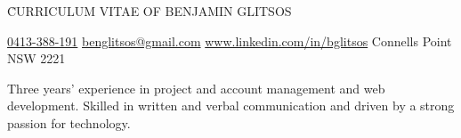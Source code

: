 \documentclass{resume}
\begin{document}
\h{CURRICULUM VITAE OF BENJAMIN GLITSOS}

\begin{center}
    \href{tel:0413-388-191}{0413-388-191} \textbar{} \href{mailto:benglitsos@gmail.com}{benglitsos@gmail.com} \textbar{} \href{www.linkedin.com/in/bglitsos}{www.linkedin.com/in/bglitsos} \textbar{} Connells Point NSW 2221
\end{center}


\begin{center}
    Three years' experience in project and account management and web development. Skilled in written and verbal communication and driven by a strong passion for technology.
\end{center}

\end{document}
